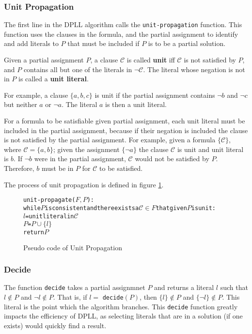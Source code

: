 \subsubsection{Unit Propagation}
\label{impl.unit}
The first line in the  DPLL algorithm calls the \texttt{unit-propagation} function.
This function uses the clauses in the formula, and the partial assignment to identify and add literals to $P$ that must be included if $P$ is to be a partial solution.

\begin{defs}
Given a partial assignment $P$, a clause $\mathcal{C}$ is called \textbf{unit} iff $\mathcal{C}$ is not satisfied by $P$, and $P$ contains all but one of the literals in $\neg \mathcal{C}$.
The literal whose negation is not in $P$ is called a \textbf{unit literal}. 
\end{defs}

For example, a clause $\{a,b,c\}$ is unit if the partial assignment contains $\neg b$ and $\neg c$ but neither $a$ or $\neg a$.
The literal $a$ is then a unit literal.

For a formula to be satisfiable given partial assignment, each unit literal must be included in the partial assignment,
because if their negation is included the clause is not satisfied by the partial assignment.
For example, given a formula $\{\mathcal{C}\}$, where $\mathcal{C} = \{a,b\}$;
given the assignment $\{\neg a\}$ the clause $\mathcal{C}$ is unit and unit literal is $b$.
If $\neg b$ were in the partial assignment, $\mathcal{C}$ would not be satisfied by $P$.
Therefore, $b$ must be in $P$ for $\mathcal{C}$ to be satisfied.

The process of unit propagation is defined in figure \ref{impl.propagation}.
\begin{figure}[htp]
\begin{center}
\begin{alltt}
unit-propagate(\(F, P\)):
  while \(P\) is consistent and there exists a \(\mathcal{C} \in F\) that given \(P\) is unit:
    \(l\) = unit literal in \(\mathcal{C}\)
    \(P\) = \(P \cup \{l\}\)
  return \(P\)
\end{alltt}
  \caption{Pseudo code of Unit Propagation}
  \label{impl.propagation}
\end{center}
\end{figure}

\subsubsection{Decide}
\label{impl.litorder}
The function \verb+decide+ takes a partial assignmnet $P$ and returns a literal $l$ such that $l \not \in P$ and $\neg l \not \in P$.
That is, if $l =$ \verb+decide+$(P)$, then $\{l\} \not \in P$ and $\{\neg l\} \not \in P$.
This literal is the point which the algorithm branches.
This \verb+decide+ function greatly impacts the efficiency of DPLL, as selecting literals that are in a solution (if one exists) would quickly find a result.

